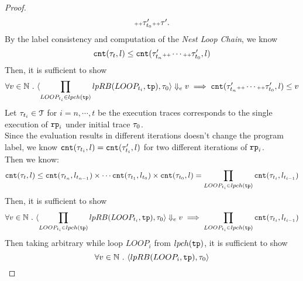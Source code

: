 \begin{proof}
\[\begin{array}{l}
{        {\scriptscriptstyle ++}\ensuremath{\mathtt{\tau}}_{t_0}' {\scriptscriptstyle ++}\ensuremath{\mathtt{\tau}}'}.
          \end{array}
        \]
        By the label consistency and computation of the 
        \emph{Nest Loop Chain}, we know
        \[
          \mathtt{cnt}(\mathtt{\tau}_t, l) \leq \mathtt{cnt}(\mathtt{\tau}_{t_n}' {\scriptscriptstyle ++} \cdots 
          {\scriptscriptstyle ++} \mathtt{\tau}_{t_0}', l)
          \] 
        Then, it is sufficient to show 
        \[
          \forall v \in \mathbb{N} ~.~ 
        \langle \prod_{LOOP_{t_i} \in lpch(\mathtt{tp})} lpRB(LOOP_{t_i}, \mathtt{tp}), \mathtt{\tau}_0
         \rangle \Downarrow_e v 
        \implies  \mathtt{cnt}(\mathtt{\tau}_{t_n}' {\scriptscriptstyle ++} \cdots 
        {\scriptscriptstyle ++} \mathtt{\tau}_{t_0}', l) \leq v
      \]
%
Let $\mathtt{\tau}_{t_i} \in \mathcal{T}$ for $i = n, \cdots, t$ 
be the execution traces corresponds to the single execution of $\mathtt{rp}_i$ under initial trace $\mathtt{\tau}_0$.
\\
Since the evaluation results in different iterations doesn't change the program label,
we know $\mathtt{cnt}(\mathtt{\tau}_{t_i}, l) = \mathtt{cnt}(\mathtt{\tau}_{t_i}', l)$ for two different iterations of $\mathtt{rp}_i$.
\\
Then we know:
\[
  \mathtt{cnt}(\mathtt{\tau}_t, l) \leq 
  \mathtt{cnt}(\mathtt{\tau}_{t_n}, l_{t_{n-1}}) \times \cdots 
  \mathtt{cnt}(\mathtt{\tau}_{t_1}, l_{t_{0}}) \times \mathtt{cnt}(\mathtt{\tau}_{t_0}, l)
  = \prod\limits_{LOOP_{t_i} \in lpch(\mathtt{tp})} \mathtt{cnt}(\mathtt{\tau}_{t_i}, l_{t_{i-1}})
  \]
%
Then, it is sufficient to show 
\[
  \forall v \in \mathbb{N} ~.~ 
\langle \prod_{LOOP_{t_i} \in lpch(\mathtt{tp})} lpRB(LOOP_{t_i}, \mathtt{tp}), \mathtt{\tau}_0
 \rangle \Downarrow_e v 
\implies  
\prod\limits_{LOOP_{t_i} \in lpch(\mathtt{tp})} \mathtt{cnt}(\mathtt{\tau}_{t_i}, l_{t_{i-1}})
\]
%
Then taking arbitrary while loop $LOOP_i$ from $lpch(\mathtt{tp})$, it is sufficient to show
% 
        \[
          \forall v \in \mathbb{N} ~.~ 
          \langle lpRB(LOOP_i, \mathtt{tp}), \mathtt{\tau}_0
 \rangle\]
\end{proof}
